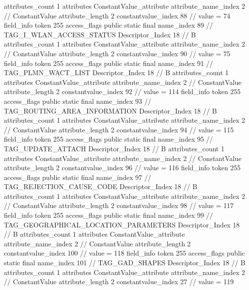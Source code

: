 {{{{{				attributes_count	1
				attributes {
				ConstantValue_attribute {
					attribute_name_index	2		// ConstantValue
					attribute_length	2
					constantvalue_index	88		// value = 74
				}
				}
			}
			field_info {
				token	255
				access_flags	public static final
				name_index	89		// TAG_I_WLAN_ACCESS_STATUS
				Descriptor_Index	18		// B
				attributes_count	1
				attributes {
				ConstantValue_attribute {
					attribute_name_index	2		// ConstantValue
					attribute_length	2
					constantvalue_index	90		// value = 75
				}
				}
			}
			field_info {
				token	255
				access_flags	public static final
				name_index	91		// TAG_PLMN_WACT_LIST
				Descriptor_Index	18		// B
				attributes_count	1
				attributes {
				ConstantValue_attribute {
					attribute_name_index	2		// ConstantValue
					attribute_length	2
					constantvalue_index	92		// value = 114
				}
				}
			}
			field_info {
				token	255
				access_flags	public static final
				name_index	93		// TAG_ROUTING_AREA_INFORMATION
				Descriptor_Index	18		// B
				attributes_count	1
				attributes {
				ConstantValue_attribute {
					attribute_name_index	2		// ConstantValue
					attribute_length	2
					constantvalue_index	94		// value = 115
				}
				}
			}
			field_info {
				token	255
				access_flags	public static final
				name_index	95		// TAG_UPDATE_ATTACH
				Descriptor_Index	18		// B
				attributes_count	1
				attributes {
				ConstantValue_attribute {
					attribute_name_index	2		// ConstantValue
					attribute_length	2
					constantvalue_index	96		// value = 116
				}
				}
			}
			field_info {
				token	255
				access_flags	public static final
				name_index	97		// TAG_REJECTION_CAUSE_CODE
				Descriptor_Index	18		// B
				attributes_count	1
				attributes {
				ConstantValue_attribute {
					attribute_name_index	2		// ConstantValue
					attribute_length	2
					constantvalue_index	98		// value = 117
				}
				}
			}
			field_info {
				token	255
				access_flags	public static final
				name_index	99		// TAG_GEOGRAPHICAL_LOCATION_PARAMETERS
				Descriptor_Index	18		// B
				attributes_count	1
				attributes {
				ConstantValue_attribute {
					attribute_name_index	2		// ConstantValue
					attribute_length	2
					constantvalue_index	100		// value = 118
				}
				}
			}
			field_info {
				token	255
				access_flags	public static final
				name_index	101		// TAG_GAD_SHAPES
				Descriptor_Index	18		// B
				attributes_count	1
				attributes {
				ConstantValue_attribute {
					attribute_name_index	2		// ConstantValue
					attribute_length	2
					constantvalue_index	27		// value = 119
				}
				}
}}}}}
